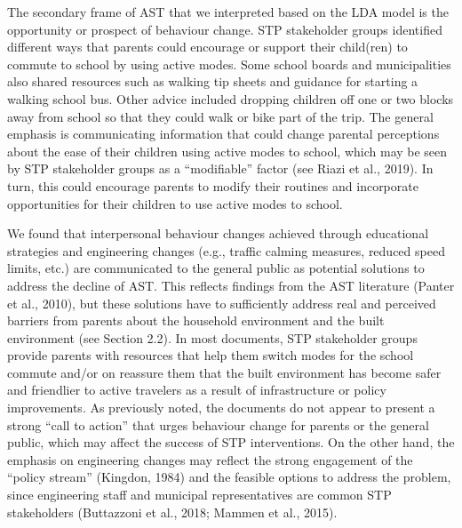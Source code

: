 \documentclass[]{elsarticle} %
\begin{document}
The secondary frame of AST that we interpreted based on the LDA model is
the opportunity or prospect of behaviour change. STP stakeholder groups
identified different ways that parents could encourage or support their
child(ren) to commute to school by using active modes. Some school
boards and municipalities also shared resources such as walking tip
sheets and guidance for starting a walking school bus. Other advice
included dropping children off one or two blocks away from school so
that they could walk or bike part of the trip. The general emphasis is
communicating information that could change parental perceptions about
the ease of their children using active modes to school, which may be
seen by STP stakeholder groups as a ``modifiable'' factor (see Riazi et
al., 2019). In turn, this could encourage parents to modify their
routines and incorporate opportunities for their children to use active
modes to school.

We found that interpersonal behaviour changes achieved through
educational strategies and engineering changes (e.g., traffic calming
measures, reduced speed limits, etc.) are communicated to the general
public as potential solutions to address the decline of AST. This
reflects findings from the AST literature (Panter et al., 2010), but
these solutions have to sufficiently address real and perceived barriers
from parents about the household environment and the built environment
(see Section 2.2). In most documents, STP stakeholder groups provide
parents with resources that help them switch modes for the school
commute and/or on reassure them that the built environment has become
safer and friendlier to active travelers as a result of infrastructure
or policy improvements. As previously noted, the documents do not appear
to present a strong ``call to action'' that urges behaviour change for
parents or the general public, which may affect the success of STP
interventions. On the other hand, the emphasis on engineering changes
may reflect the strong engagement of the ``policy stream'' (Kingdon,
1984) and the feasible options to address the problem, since engineering
staff and municipal representatives are common STP stakeholders
(Buttazzoni et al., 2018; Mammen et al., 2015).
\end{document}
